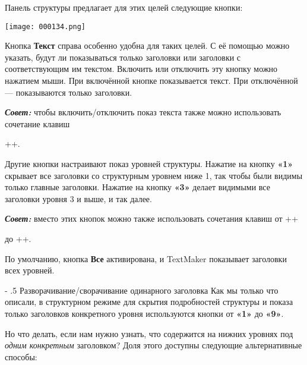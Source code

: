 ﻿\documentclass[a4paper,10pt]{article}
\makeatletter
\renewcommand\paragraph{%
   \@startsection{paragraph}{4}{0mm}%
      {-\baselineskip}%
      {.5\baselineskip}%
      {\normalfont\normalsize\bfseries}}
\makeatother
\begin{document}
Панель структуры предлагает для этих целей следующие кнопки:

\texttt{[image: 000134.png]}

Кнопка \textbf{Текст} справа особенно удобна для таких целей. С её помощью можно указать, будут ли показываться только заголовки или заголовки с соответствующим им текстом. Включить или отключить эту кнопку можно нажатием мыши. При включённой кнопке показывается текст. При отключённой — показываются только заголовки.
\newline
\newline
\begin{mdframed}[backgroundcolor=blue!10]
\textbf{\textit{Совет:}} чтобы включить/отключить показ текста также можно использовать сочетание клавиш 

++.
\end{mdframed}

Другие кнопки настраивают показ уровней структуры. Нажатие на кнопку \textbf{«1»} скрывает все заголовки со структурным уровнем ниже 1, так чтобы были видимы только главные заголовки. Нажатие на кнопку \textbf{«3»} делает видимыми все заголовки уровня 3 и выше, и так далее.

\begin{mdframed}[backgroundcolor=blue!10]
\textbf{\textit{Совет:}} вместо этих кнопок можно также использовать сочетания клавиш от ++

 до ++.
\end{mdframed}

По умолчанию, кнопка \textbf{Все} активирована, и TextMaker показывает заголовки всех уровней.

\paragraph{Разворачивание/сворачивание одинарного заголовка}
Как мы только что описали, в структурном режиме для скрытия подробностей структуры и показа только заголовков конкретного уровня используются кнопки от \textbf{«1»} до \textbf{«9»}.

Но что делать, если нам нужно узнать, что содержится на нижних уровнях под \textit{одним конкретным} заголовком? Доля этого доступны следующие альтернативные способы:
\end{document}

